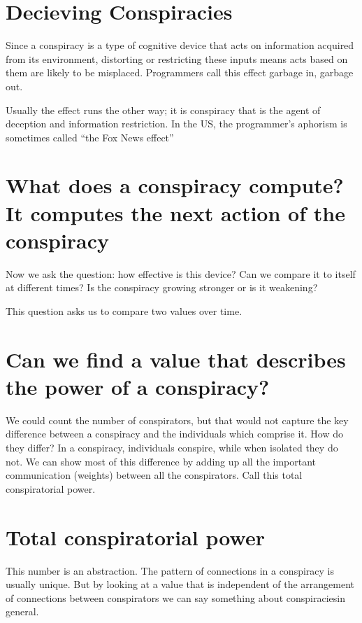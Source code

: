 \documentclass[letterpaper,12pt,english]{sphinxmanual}
\begin{document}
\section{Decieving Conspiracies}
\label{assange:decieving-conspiracies}
Since a conspiracy is a type of cognitive device that acts on information acquired from its environment, distorting or restricting these inputs means acts based on them are likely to be misplaced. Programmers call this effect garbage in, garbage out.

Usually the effect runs the other way; it is conspiracy that is the agent of deception and information restriction. In the US, the programmer’s aphorism is sometimes called “the Fox News effect”


\section{What does a conspiracy compute? It computes the next action of the conspiracy}
\label{assange:what-does-a-conspiracy-compute-it-computes-the-next-action-of-the-conspiracy}
Now we ask the question: how effective is this device? Can we compare it to itself at different times? Is the conspiracy growing stronger or is it weakening?

This question asks us to compare two values over time.


\section{Can we find a value that describes the power of a conspiracy?}
\label{assange:can-we-find-a-value-that-describes-the-power-of-a-conspiracy}
We could count the number of conspirators, but that would not capture the key difference between a conspiracy and the individuals which comprise it. How do they differ? In a conspiracy, individuals conspire, while when isolated they do not. We can show most of this difference by adding up all the important communication (weights) between all the conspirators. Call this total conspiratorial power.


\section{Total conspiratorial power}
\label{assange:total-conspiratorial-power}
This number is an abstraction. The pattern of connections in a conspiracy is usually unique. But by looking at a value that is independent of the arrangement of connections between conspirators we can say something about conspiraciesin general.
\end{document}
